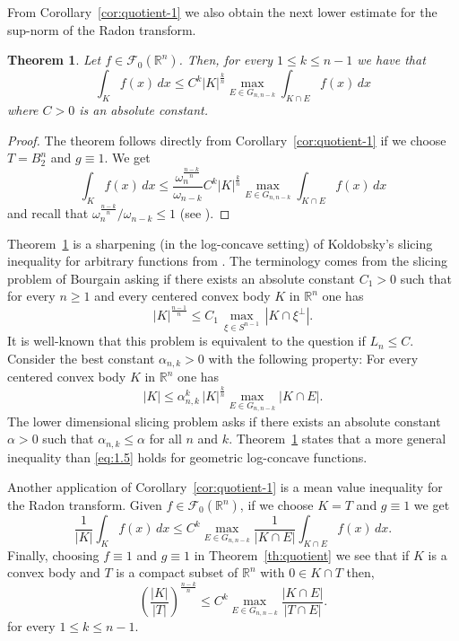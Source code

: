 \documentclass[11pt,leqno]{article}
\newtheorem{theorem}{Theorem}[section]
\theoremstyle{definition}
\theoremstyle{remark}
\numberwithin{equation}{section}
\newcommand{\ls}{\leqslant}
\newcommand{\gr}{\geqslant}
\newcommand{\1}{\textbf{1}}
\newcommand{\R}{\mathbb{R}}
\begin{document}
From Corollary~\ref{cor:quotient-1} we also obtain the next lower estimate for the sup-norm of the Radon transform.

\begin{theorem}\label{th:slicing}Let $f\in {\mathcal F}_0({\mathbb R}^n)$. Then, for every $1\ls k\ls n-1$ we have that
$$\int_Kf(x)\,dx\ls C^k |K|^{\frac kn}\max_{E\in G_{n,n-k}} \int_{K\cap E} f(x)\,dx$$
where $C>0$ is an absolute constant.
\end{theorem}

\begin{proof}The theorem follows directly from Corollary~\ref{cor:quotient-1} if we choose $T=B_2^n$ and $g\equiv 1$. We get
$$\int_Kf(x)\,dx \ls \frac{\omega_n^{\frac{n-k}{n}}}{\omega_{n-k}}C^k |K|^{\frac kn}\max_{E\in G_{n,n-k}} \int_{K\cap E} f(x)\,dx$$
and recall that $\omega_n^{\frac{n-k}{n}}/\omega_{n-k}\ls 1$ (see \cite[Lemma~2.1]{Koldobsky-Lifshits-2000}).\end{proof}

Theorem~\ref{th:slicing} is a sharpening (in the log-concave setting) of Koldobsky's slicing inequality for arbitrary functions from \cite{Koldobsky-AIM-2015}. The terminology comes from the slicing problem of Bourgain asking if there exists an absolute constant $C_1>0$ such that for every $n\gr 1$ and every centered convex body $K$ in ${\mathbb R}^n$ one has
\begin{equation}\label{eq:1.2}|K|^{\frac{n-1}{n}}\ls C_1\,\max_{\xi\in S^{n-1}}\,|K\cap \xi^{\perp }|.\end{equation}
It is well-known that this problem is equivalent to the question if $L_n\ls C$.
Consider the best constant $\alpha_{n,k}>0$ with the following property: For every centered convex body $K$ in ${\mathbb R}^n$ one has
\begin{equation}\label{eq:1.5}|K|\ls \alpha_{n,k}^k\,|K|^{\frac{k}{n}}\max_{E\in G_{n,n-k}}|K\cap E|.\end{equation}
The lower dimensional slicing problem asks if there exists an absolute constant $\alpha >0$ such that $\alpha_{n,k}\ls \alpha$
for all $n$ and $k$. Theorem~\ref{th:slicing} states that a more general inequality than \eqref{eq:1.5} holds
for geometric log-concave functions.

Another application of Corollary~\ref{cor:quotient-1} is a mean value inequality for the Radon transform.
Given $f\in {\mathcal F}_0({\mathbb R}^n)$, if we choose $K=T$ and $g\equiv 1$ we get
$$\frac{1}{|K|}\int_Kf(x)\,dx\ls C^k \max_{E\in G_{n,n-k}} \frac{1}{|K\cap E|}\int_{K\cap E}f(x)\,dx.$$
Finally, choosing $f\equiv 1$ and $g\equiv 1$ in Theorem~\ref{th:quotient} we see that if $K$ is a convex body and $T$ is a compact subset of $\R^n$ with $0\in K\cap T$ then,
$$\left(\frac{|K|}{|T|}\right)^{\frac {n-k}n}\ls C^k \max_{E\in G_{n,n-k}} \frac{|K\cap E|}{|T\cap E|}.$$
for every $1\ls k\ls n-1$.
\end{document}
